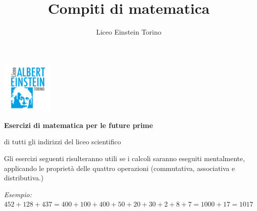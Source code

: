 \documentclass[]{article}
\title{Compiti di matematica}
\author{Liceo Einstein Torino}
\begin{document}
{\vspace*{-2.5cm}\hspace*{15.5cm}\includegraphics[height=2.5cm]{logo}}

\begin{center}
	{\vspace*{-0.5cm}\LARGE\bfseries Esercizi di matematica per le future prime\par}
	\par{di tutti gli indirizzi del liceo scientifico}
\end{center}

\parskip=10pt

\par{Gli esercizi seguenti risulteranno utili se i calcoli saranno eseguiti mentalmente, applicando le proprietà delle quattro operazioni (commutativa, associativa e distributiva.)}

\parskip=10pt

\par{\textit{Esempio: }\(452 + 128 + 437 = 400 + 100 + 400 + 50 + 20 + 30 + 2 + 8 + 7 = 1000 + 17 = 1017\)}

\parskip=20pt
\end{document}
